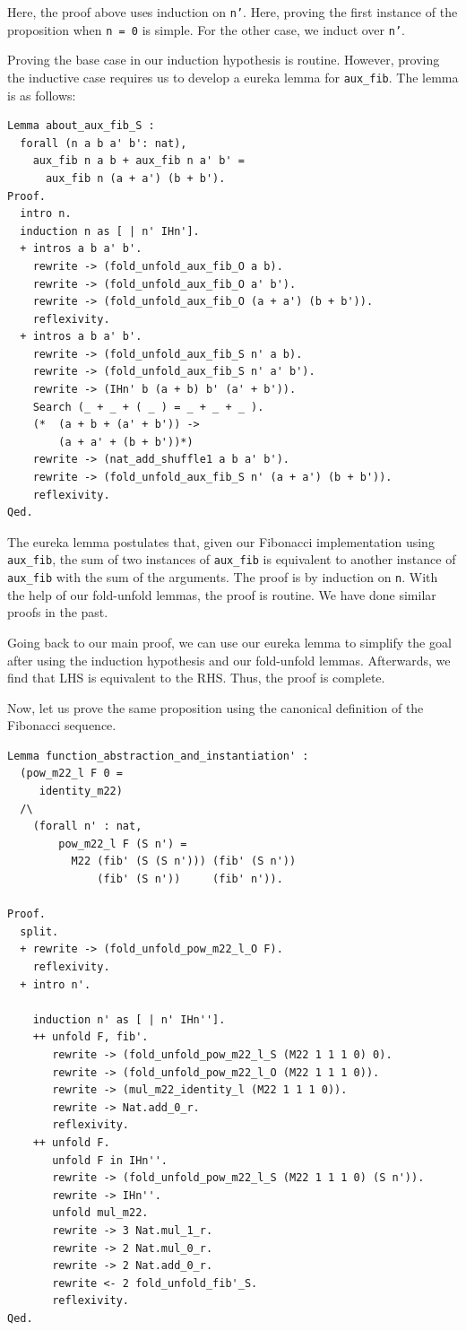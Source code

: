 \documentclass{article}
\begin{document}
Here, the proof above uses induction on \texttt{n'}. Here, proving the first instance of the proposition when \texttt{n = 0} is simple. For the other case, we induct over \texttt{n'}. 

Proving the base case in our induction hypothesis is routine. However, proving the inductive case requires us to develop a eureka lemma for \texttt{aux\_fib}. The lemma is as follows:

\begin{lstlisting}
Lemma about_aux_fib_S :
  forall (n a b a' b': nat),
    aux_fib n a b + aux_fib n a' b' =
      aux_fib n (a + a') (b + b').
Proof.
  intro n.
  induction n as [ | n' IHn'].
  + intros a b a' b'.
    rewrite -> (fold_unfold_aux_fib_O a b).
    rewrite -> (fold_unfold_aux_fib_O a' b').
    rewrite -> (fold_unfold_aux_fib_O (a + a') (b + b')).
    reflexivity.
  + intros a b a' b'.
    rewrite -> (fold_unfold_aux_fib_S n' a b).
    rewrite -> (fold_unfold_aux_fib_S n' a' b').
    rewrite -> (IHn' b (a + b) b' (a' + b')).
    Search (_ + _ + ( _ ) = _ + _ + _ ).
    (*  (a + b + (a' + b')) ->
        (a + a' + (b + b'))*)
    rewrite -> (nat_add_shuffle1 a b a' b').
    rewrite -> (fold_unfold_aux_fib_S n' (a + a') (b + b')).
    reflexivity.
Qed.
\end{lstlisting}

The eureka lemma postulates that, given our Fibonacci implementation using \texttt{aux\_fib}, the sum of two instances of \texttt{aux\_fib} is equivalent to another instance of \texttt{aux\_fib} with the sum of the arguments. The proof is by induction on \texttt{n}. With the help of our fold-unfold lemmas, the proof is routine. We have done similar proofs in the past.

Going back to our main proof, we can use our eureka lemma to simplify the goal after using the induction hypothesis and our fold-unfold lemmas. Afterwards, we find that LHS is equivalent to the RHS. Thus, the proof is complete.

Now, let us prove the same proposition using the canonical definition of the Fibonacci sequence.

\begin{lstlisting}
Lemma function_abstraction_and_instantiation' :
  (pow_m22_l F 0 =
     identity_m22)
  /\
    (forall n' : nat,
        pow_m22_l F (S n') =
          M22 (fib' (S (S n'))) (fib' (S n'))    
              (fib' (S n'))     (fib' n')).

Proof.
  split.
  + rewrite -> (fold_unfold_pow_m22_l_O F).
    reflexivity.
  + intro n'.
    
    induction n' as [ | n' IHn''].
    ++ unfold F, fib'.
       rewrite -> (fold_unfold_pow_m22_l_S (M22 1 1 1 0) 0).
       rewrite -> (fold_unfold_pow_m22_l_O (M22 1 1 1 0)).
       rewrite -> (mul_m22_identity_l (M22 1 1 1 0)).
       rewrite -> Nat.add_0_r.
       reflexivity.
    ++ unfold F.
       unfold F in IHn''.
       rewrite -> (fold_unfold_pow_m22_l_S (M22 1 1 1 0) (S n')).
       rewrite -> IHn''.
       unfold mul_m22.
       rewrite -> 3 Nat.mul_1_r.
       rewrite -> 2 Nat.mul_0_r.
       rewrite -> 2 Nat.add_0_r.
       rewrite <- 2 fold_unfold_fib'_S.
       reflexivity.
Qed.
\end{lstlisting}
\end{document}
